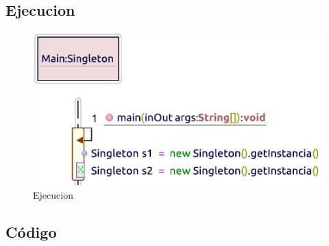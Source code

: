 \subsection{Ejecucion}
\begin{figure}[h!]
	\centering
	\includegraphics[width=0.7\linewidth]{Diseno/Creacionales/imgs/ejecucion}
	\caption{Ejecucion}
\end{figure}



\subsection{Código}

